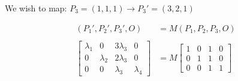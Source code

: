 \documentclass[12pt, oneside]{article}
\begin{document}
We wish to map: $P_3 = (1, 1, 1) \to {P_3}' = (3, 2, 1)$

\begin{align*}
({P_1}', {P_2}', {P_3}', O) &= M ({P_1}, {P_2}, {P_3}, O) \\ \\
\begin{bmatrix}
\lambda_1 	& 0 		& 3\lambda_3 	& 0 \\
0 			& \lambda_2 & 2\lambda_3 	& 0 \\
0		 	& 0 		& \lambda_3 	& \lambda_4 
\end{bmatrix}  &=
M \begin{bmatrix}
1 			& 0 	& 1 	& 0 \\
0 			& 1 	& 1 	& 0 \\
0		 	& 0 	& 1 	& 1 
\end{bmatrix} 
\end{align*}
\end{document}
